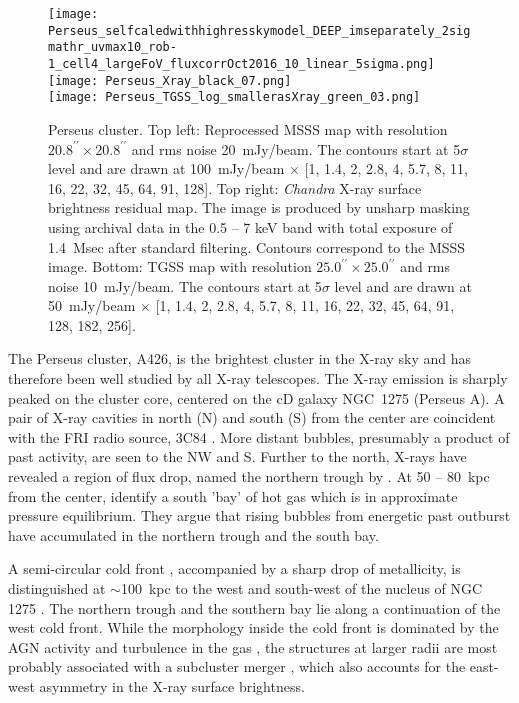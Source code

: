 \documentclass{aa}  %
\begin{document}
\begin{figure*}[t]
\begin{center}
\texttt{[image: Perseus\_selfcaledwithhighresskymodel\_DEEP\_imseparately\_2sigmathr\_uvmax10\_rob-1\_cell4\_largeFoV\_fluxcorrOct2016\_10\_linear\_5sigma.png]}
\texttt{[image: Perseus\_Xray\_black\_07.png]} \\
\texttt{[image: Perseus\_TGSS\_log\_smallerasXray\_green\_03.png]} 
\end{center}
\caption{\small  Perseus cluster. Top left: Reprocessed MSSS map with resolution $20.8^{\prime\prime}\times20.8^{\prime\prime}$ and rms noise 20~mJy/beam. The contours start at 5$\sigma$ level and are drawn at 100~mJy/beam $\times$ [1, 1.4, 2, 2.8, 4, 5.7, 8, 11, 16, 22, 32, 45, 64, 91, 128]. Top right:  \textit{Chandra} X-ray surface brightness residual map. The image is produced by unsharp masking using archival data in the 0.5 -- 7 keV band with total exposure of 1.4~Msec after standard filtering. Contours correspond to the MSSS image. Bottom:  TGSS map with resolution $25.0^{\prime\prime}\times25.0^{\prime\prime}$ and rms noise 10~mJy/beam. The contours start at 5$\sigma$ level and are drawn at 50~mJy/beam $\times$ [1, 1.4, 2, 2.8, 4, 5.7, 8, 11, 16, 22, 32, 45, 64, 91, 128, 182, 256].
\label{fig:perseus_all}}
\vspace{0.15in}
\end{figure*}



The Perseus cluster, A426, is the brightest cluster in the X-ray sky and has therefore been well studied by all X-ray telescopes. 
The X-ray emission is sharply peaked on the cluster core, centered on the cD galaxy NGC~1275 (Perseus A). 
A pair of X-ray cavities in north (N) and south (S) from the center are coincident with the  FRI radio source, 3C84 \citep{Pedlar1990, Boehringer1993, Fabian2000, Churazov2000}. 
More distant bubbles, presumably a product of past activity, are seen to the NW and S.
Further to the north, X-rays have revealed a region of flux drop, named the northern trough by \cite{Fabian2011}.
At 50 -- 80~kpc from the center, \cite{Fabian2006, Fabian2011} identify a south 'bay' of hot gas which is in approximate pressure equilibrium.
They argue that rising bubbles from energetic past outburst have accumulated in the northern trough and the south bay.

A semi-circular cold front \citep{Markevitch2007}, accompanied by a sharp drop of metallicity, is distinguished at $\sim$100~kpc to the west and south-west of the nucleus of NGC 1275 \citep{Fabian2011}. 
The northern trough and the southern bay lie along a continuation of the west cold front. 
While the morphology inside the cold front is dominated by the AGN activity and turbulence in the gas \citep{Hitomi2016}, the structures at larger radii are most probably associated with a subcluster merger \citep{Churazov2003}, which also accounts for the east-west asymmetry in the X-ray surface brightness.
\end{document}
